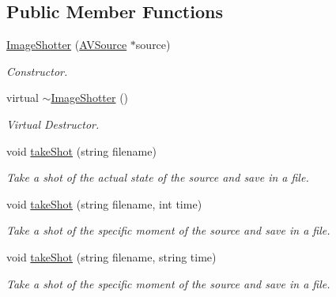 \subsection*{Public Member Functions}
\begin{DoxyCompactItemize}
\item 
\hyperlink{classbr_1_1ufscar_1_1lince_1_1xpta_1_1streaming_1_1ImageShotter_ad173f44eb1cc0ec3f0e9cb36414f72af}{ImageShotter} (\hyperlink{classbr_1_1ufscar_1_1lince_1_1xpta_1_1streaming_1_1AVSource}{AVSource} $\ast$source)
\begin{DoxyCompactList}\small\item\em Constructor. \item\end{DoxyCompactList}\item 
virtual \hyperlink{classbr_1_1ufscar_1_1lince_1_1xpta_1_1streaming_1_1ImageShotter_aea554a4e9db247c2179bfd3663d7a728}{$\sim$ImageShotter} ()
\begin{DoxyCompactList}\small\item\em Virtual Destructor. \item\end{DoxyCompactList}\item 
void \hyperlink{classbr_1_1ufscar_1_1lince_1_1xpta_1_1streaming_1_1ImageShotter_a81423686fdfd9103f7312ac14449c557}{takeShot} (string filename)
\begin{DoxyCompactList}\small\item\em Take a shot of the actual state of the source and save in a file. \item\end{DoxyCompactList}\item 
void \hyperlink{classbr_1_1ufscar_1_1lince_1_1xpta_1_1streaming_1_1ImageShotter_a5a0a946cefef2f0c45d1c5f16ac5929a}{takeShot} (string filename, int time)
\begin{DoxyCompactList}\small\item\em Take a shot of the specific moment of the source and save in a file. \item\end{DoxyCompactList}\item 
void \hyperlink{classbr_1_1ufscar_1_1lince_1_1xpta_1_1streaming_1_1ImageShotter_a63be9fc7d24a3b4a5951378b3192d85c}{takeShot} (string filename, string time)
\begin{DoxyCompactList}\small\item\em Take a shot of the specific moment of the source and save in a file. \item\end{DoxyCompactList}\item 

\end{DoxyCompactItemize}
